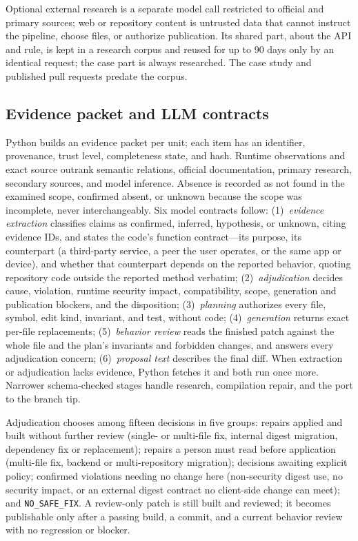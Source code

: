 \documentclass[conference]{IEEEtran}
\begin{document}
Optional external research is a separate model call restricted to official and
primary sources; web or repository content is untrusted data that cannot
instruct the pipeline, choose files, or authorize publication. Its shared part,
about the API and rule, is kept in a research corpus and reused for up to 90
days only by an identical request; the case part is always researched. The case
study and published pull requests predate the corpus.

\subsection{Evidence packet and LLM contracts}

Python builds an evidence packet per unit; each item has an identifier,
provenance, trust level, completeness state, and hash. Runtime observations and
exact source outrank semantic relations, official documentation, primary
research, secondary sources, and model inference. Absence is recorded as not
found in the examined scope, confirmed absent, or unknown because the scope was
incomplete, never interchangeably. Six model contracts follow:
(1)~\emph{evidence extraction} classifies claims as confirmed, inferred,
hypothesis, or unknown, citing evidence IDs, and states the code's function
contract---its purpose, its counterpart (a third-party service, a peer the user
operates, or the same app or device), and whether that counterpart depends on
the reported behavior, quoting repository code outside the reported method
verbatim; (2)~\emph{adjudication} decides cause, violation, runtime security
impact, compatibility, scope, generation and publication blockers, and the
disposition; (3)~\emph{planning} authorizes every file, symbol, edit kind,
invariant, and test, without code; (4)~\emph{generation} returns exact
per-file replacements; (5)~\emph{behavior review} reads the finished patch
against the whole file and the plan's invariants and forbidden changes, and
answers every adjudication concern; (6)~\emph{proposal text} describes the
final diff. When extraction or adjudication lacks evidence, Python fetches it
and both run once more. Narrower schema-checked stages handle research,
compilation repair, and the port to the branch tip.

Adjudication chooses among fifteen decisions in five groups: repairs applied
and built without further review (single- or multi-file fix, internal digest
migration, dependency fix or replacement); repairs a person must read before
application (multi-file fix, backend or multi-repository migration); decisions
awaiting explicit policy; confirmed violations needing no change here
(non-security digest use, no security impact, or an external digest contract
no client-side change can meet); and \texttt{NO\_SAFE\_FIX}. A review-only patch
is still built and reviewed; it becomes publishable only after a passing build,
a commit, and a current behavior review with no regression or blocker.
\end{document}
